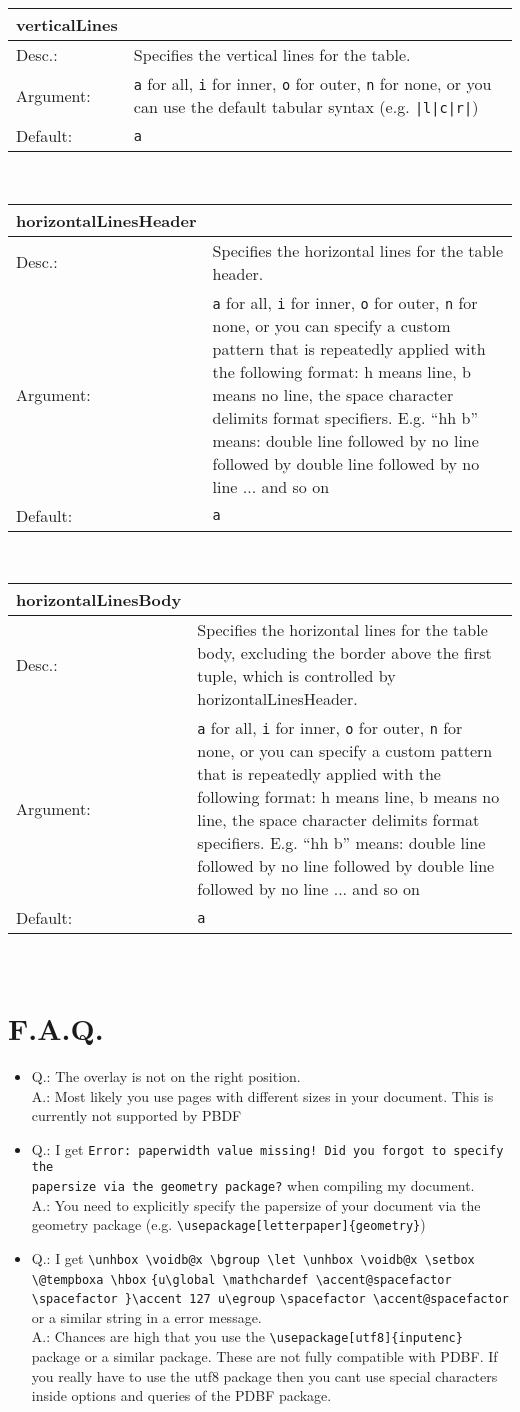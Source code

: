\documentclass[11pt]{article}
\def\a{5cm}
\def\b{10.5cm}
\def\option#1#2#3#4{%
\noindent \begin{tabular}{|p{\a}|p{\b}|}
\hline
\textbf{#1} & \\
\hline
Desc.: & #2 \\
\hline
Argument: & #3\\
\hline
Default:& #4\\
\hline
\end{tabular} \\[4pt]%
}
\begin{document}
\option
{verticalLines}
{Specifies the vertical lines for the table.}
{\texttt{a} for all, \texttt{i} for inner, \texttt{o} for outer, \texttt{n} for none, or you can use the default tabular syntax (e.g. \texttt{|l|c|r|})}
{\texttt{a}}

\option
{horizontalLinesHeader}
{Specifies the horizontal lines for the table header.}
{\texttt{a} for all, \texttt{i} for inner, \texttt{o} for outer, \texttt{n} for none, or you can specify a custom pattern that is repeatedly applied with the following format: h means line, b means no line, the space character delimits format specifiers. E.g. ``hh b'' means: double line followed by no line followed by double line followed by no line ... and so on}
{\texttt{a}}

\option
{horizontalLinesBody}
{Specifies the horizontal lines for the table body, excluding the border above the first tuple, which is controlled by horizontalLinesHeader.}
{\texttt{a} for all, \texttt{i} for inner, \texttt{o} for outer, \texttt{n} for none, or you can specify a custom pattern that is repeatedly applied with the following format: h means line, b means no line, the space character delimits format specifiers. E.g. ``hh b'' means: double line followed by no line followed by double line followed by no line ... and so on}
{\texttt{a}}

\section{F.A.Q.}
\begin{itemize}
\item Q.: The overlay is not on the right position.\\
A.: Most likely you use pages with different sizes in your document. This is currently not supported by PBDF 
\item Q.: I get \verb|Error: paperwidth value missing! Did you forgot to specify the| \\ \verb|papersize via the geometry package?| when compiling my document.\\
A.: You need to explicitly specify the papersize of your document via the geometry package (e.g. \verb|\usepackage[letterpaper]{geometry}|)
\item Q.: I get \verb|\unhbox \voidb@x \bgroup \let \unhbox \voidb@x \setbox \@tempboxa \hbox| \verb|{u\global \mathchardef \accent@spacefactor \spacefactor }\accent 127 u\egroup| \newline \verb|\spacefactor \accent@spacefactor| or a similar string in a error message.\\
A.: Chances are high that you use the \verb|\usepackage[utf8]{inputenc}| package or a similar package. These are not fully compatible with PDBF. If you really have to use the utf8 package then you cant use special characters inside options and queries of the PDBF package.
\end{itemize}
\end{document}
